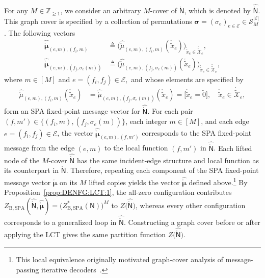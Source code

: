 \documentclass[journal]{IEEEtran}
\newcommand{\add}[1]{{\color{black}#1}}
\newcommand{\vect}[1]{ \bm{#1} }
\newcommand{\set}[1]{\mathcal{#1}}
\newcommand{\setEfull}{ \mathcal{E} }
\newcommand{\graphN}{ \mathsf{N} }
\newcommand{\defeq}{ \triangleq }
\newcommand{\sZpp}{ \mathbb{Z}_{\geq 1} }
\newcommand{\ZBSPA}{ Z_{\mathrm{B,SPA}} }
\newcommand{\LCTtset}[1]{\mathring{\tilde{\mathcal{#1}}}}
\newcommand{\LCTv}[1]{ \mathring{ \vect{#1} } }
\newcommand{\LCT}[1]{ \mathring{#1} }
\newcommand{\LCTt}[1]{ \mathring{ \tilde{#1} } }
\newcommand{\vsigma}{\vect{\sigma}}
\newcommand{\hLCT}[1]{ \hat{ \LCT{#1} } }
\newcommand{\hLCTgraphN}{ \hLCT{\graphN} }
\newcommand{\tzero}{\tilde{0}}
\begin{document}
For any $ M \in \sZpp $, we consider an arbitrary $M$-cover of $ \LCT{\graphN} $, which is denoted by $ \hLCTgraphN $. This graph cover is specified by a collection of permutations
$ \vsigma = (\sigma_e)_{e \in \setEfull}
  \in \set{S}^{|\setEfull|}_{M} $.
The following vectors
\begin{align*}
  \hat{\LCTv{\mu}}_{(e,m),(f_{i},m)}
   & \defeq \bigl( \hat{\LCT{\mu}}_{(e,m),(f_{i},m)}(\LCTt{x}_{e})
  \bigr)_{\! \LCTt{x}_{e} \in \LCTtset{X}_{e}},                                \\
  \hat{\LCTv{\mu}}_{(e,m),(f_{j},\sigma_{e}(m))}
   & \defeq \bigl( \hat{\LCT{\mu}}_{(e,m),(f_{j},\sigma_{e}(m))}(\LCTt{x}_{e})
  \bigr)_{\! \LCTt{x}_{e} \in \LCTtset{X}_{e}},
\end{align*}
where $m \in [M]$ and $e = (f_{i},f_{j}) \in \setEfull,$ and
whose elements are specified by
\begin{align*}
  \hat{\LCT{\mu}}_{(e,m),(f_{i},m)}(\LCTt{x}_{e})
   & =
  \hat{\LCT{\mu}}_{(e,m),(f_{j},\sigma_{e}(m))}(\LCTt{x}_{e}) \! = \bigl[ \LCTt{x}_{e} \! = \! \tzero \bigr],
  \quad
  \LCTt{x}_{e} \in \LCTtset{X}_{e},
\end{align*}
form an SPA fixed-point message vector for $ \hLCTgraphN $.
For each pair $(f,m') \in \{ (f_{i},m), (f_{j}, \sigma_{e}(m)) \}$, each integer $ m \in [M] $, and each edge $ e=(f_{i},f_{j}) \in \setEfull $, the vector $ \hat{\LCTv{\mu}}_{(e,m),(f,m')} $ corresponds to the SPA fixed-point message from the edge $ (e,m) $ to the local function $ (f,m') $ in $ \hLCTgraphN $.
\add{Each lifted node of the $M$-cover $\hLCTgraphN$ has the same incident-edge structure and local function as its counterpart in $\LCT{\graphN}$. Therefore, repeating each component of the SPA fixed-point message vector $\LCTv{\mu}$ on its $M$ lifted copies yields the vector $\hat{\LCTv{\mu}}$ defined above.\footnote{This local equivalence originally motivated graph-cover analysis of message-passing iterative decoders~\cite{Koetter2003,Koetter2007}.}}
\add{By Proposition~\ref{prop:DENFG:LCT:1}, the all-zero configuration contributes $ \ZBSPA(\hLCTgraphN, \hat{\LCTv{\mu}}) = \bigl( \ZBSPA^{*}(\graphN) \bigr)^{M}$ to $Z\bigl( \hLCTgraphN \bigr)$, whereas every other configuration corresponds to a generalized loop in $\hLCTgraphN$.
  Constructing a graph cover before or after applying the LCT gives the same partition function $Z\bigl( \hLCTgraphN \bigr)$.}
\end{document}
